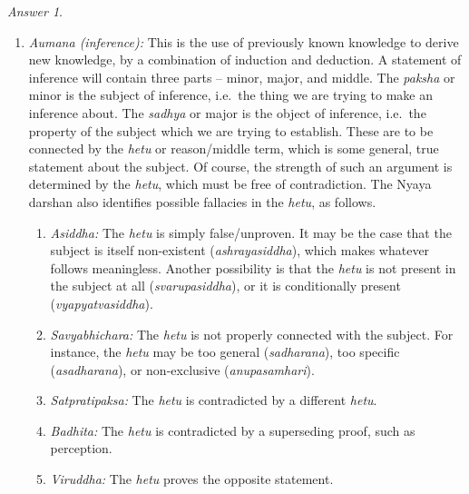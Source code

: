 \documentclass[11pt]{article}
\theoremstyle{remark}
\newtheorem*{answer}{Answer}
\begin{document}
\begin{answer}
\begin{enumerate}
            \item \textit{Aumana (inference):} This is the use of previously known
            knowledge to derive new knowledge, by a combination of induction and
            deduction. A statement of inference will contain three parts -- minor,
            major, and middle. The \emph{paksha} or minor is the subject of
            inference, i.e.\ the thing we are trying to make an inference about. The
            \emph{sadhya} or major is the object of inference, i.e.\ the property of
            the subject which we are trying to establish. These are to be connected
            by the \emph{hetu} or reason/middle term, which is some general, true
            statement about the subject. Of course, the strength of such an argument
            is determined by the \emph{hetu}, which must be free of contradiction.
            The Nyaya darshan also identifies possible fallacies in the \emph{hetu},
            as follows.
            \begin{enumerate}
                \item \textit{Asiddha:} The \emph{hetu} is simply false/unproven. It
                may be the case that the subject is itself non-existent
                (\emph{ashrayasiddha}), which makes whatever follows meaningless.
                Another possibility is that the \emph{hetu} is not present in the
                subject at all (\emph{svarupasiddha}), or it is conditionally present
                (\emph{vyapyatvasiddha}).

                \item \textit{Savyabhichara:} The \emph{hetu} is not properly
                connected with the subject. For instance, the \emph{hetu} may be too
                general (\emph{sadharana}), too specific (\emph{asadharana}), or
                non-exclusive (\emph{anupasamhari}).

                \item \textit{Satpratipaksa:} The \emph{hetu} is contradicted by a
                different \emph{hetu}.

                \item \textit{Badhita:} The \emph{hetu} is contradicted by a
                superseding proof, such as perception.

                \item \textit{Viruddha:} The \emph{hetu} proves the opposite statement.
            \end{enumerate}


\end{enumerate}
\end{answer}
\end{document}
